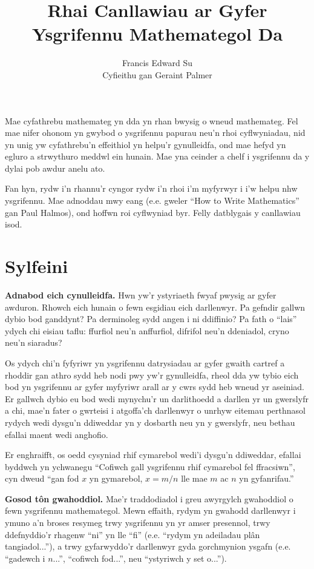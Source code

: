 \documentclass{article}
\title{Rhai Canllawiau ar Gyfer Ysgrifennu Mathemategol Da}
\author{Francis Edward Su\\\small{Cyfieithu gan Geraint Palmer}}
\date{}
\begin{document}
\maketitle

\begin{multicols}{2}

Mae cyfathrebu mathemateg yn dda yn rhan bwysig o wneud mathemateg.
Fel mae nifer ohonom yn gwybod o ysgrifennu papurau neu'n rhoi cyflwyniadau, nid
yn unig yw cyfathrebu'n effeithiol yn helpu'r gynulleidfa, ond mae hefyd yn
egluro a strwythuro meddwl ein hunain.
Mae yna ceinder a chelf i ysgrifennu da y dylai pob awdur anelu ato.

Fan hyn, rydw i'n rhannu'r cyngor rydw i'n rhoi i'm myfyrwyr i i'w helpu nhw
ysgrifennu.
Mae adnoddau mwy eang (e.e. gweler ``How to Write Mathematics'' gan Paul
Halmos), ond hoffwn roi cyflwyniad byr.
Felly datblygais y canllawiau isod.

\section*{Sylfeini}

\textbf{Adnabod eich cynulleidfa.}
Hwn yw'r ystyriaeth fwyaf pwysig ar gyfer awduron.
Rhowch eich hunain o fewn esgidiau eich darllenwyr.
Pa gefndir gallwn dybio bod ganddynt?
Pa derminoleg sydd angen i ni ddiffinio?
Pa fath o ``lais'' ydych chi eisiau taflu: ffurfiol neu'n anffurfiol, difrifol
neu'n ddeniadol, cryno neu'n siaradus?

Os ydych chi'n fyfyriwr yn ysgrifennu datrysiadau ar gyfer gwaith cartref a
rhoddir gan athro sydd heb nodi pwy yw'r gynulleidfa, rheol dda yw tybio eich
bod yn ysgrifennu ar gyfer myfyriwr arall ar y cwrs sydd heb wneud yr aseiniad.
Er gallwch dybio eu bod wedi mynychu'r un darlithoedd a darllen yr un gwerslyfr
a chi, mae'n fater o gwrteisi i atgoffa'ch darllenwyr o unrhyw eitemau
perthnasol rydych wedi dysgu'n ddiweddar yn y dosbarth neu yn y gwerslyfr, neu
bethau efallai maent wedi anghofio.

Er enghraifft, os oedd cysyniad rhif cymarebol wedi'i dysgu'n ddiweddar, efallai
byddwch yn ychwanegu ``Cofiwch gall ysgrifennu rhif cymarebol fel ffracsiwn'',
cyn dweud ``gan fod $x$ yn gymarebol, $x = m/n$ lle mae $m$ ac $n$ yn
gyfanrifau.''

\vspace{4mm}

\textbf{Gosod t\^{o}n gwahoddiol.}
Mae'r traddodiadol i greu awyrgylch gwahoddiol o fewn ysgrifennu mathemategol.
Mewn effaith, rydym yn gwahodd darllenwyr i ymuno a'n broses resymeg trwy
ysgrifennu yn yr amser presennol, trwy ddefnyddio'r rhagenw ``ni'' yn lle ``fi''
(e.e. ``rydym yn adeiladau pl\^{a}n tangiadol...''), a trwy gyfarwyddo'r
darllenwyr gyda gorchmynion ysgafn (e.e. ``gadewch i $n$...'', ``cofiwch
fod...'', neu ``ystyriwch y set o...'').


\end{multicols}
\end{document}
